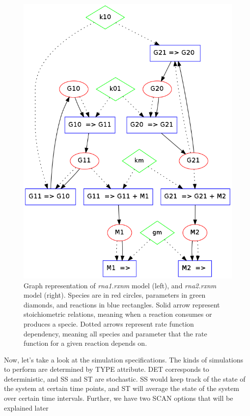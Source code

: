 \documentclass[letterpaper]{article}
\begin{document}
\begin{figure}[H]
\begin{minipage}[b]{0.48\linewidth}
    \includegraphics[scale=0.25]{figures/rna2.png}
  \end{minipage}
  \caption{Graph representation of \emph{rna1.rxnm} model (left), and
    \emph{rna2.rxnm} model (right). Species are in red circles,
    parameters in green diamonds, and reactions in blue
    rectangles. Solid arrow represent stoichiometric relations,
    meaning when a reaction consumes or produces a specie. Dotted
    arrows represent rate function dependency, meaning all species and
    parameter that the rate function for a given reaction depends on.}
  \label{fig:rna1dot}
\end{figure}

Now, let's take a look at the simulation specifications. The kinds of
simulations to perform are determined by TYPE attribute. DET
corresponds to deterministic, and SS and ST are stochastic. SS would
keep track of the state of the system at certain time points, and ST
will average the state of the system over certain time
intervals. Further, we have two SCAN options that will be explained later
\end{document}
